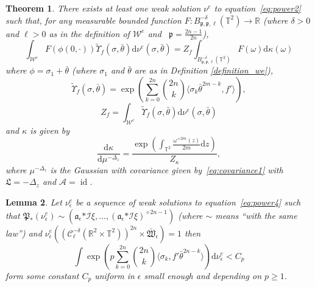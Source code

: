 \documentclass[a4paper,10pt]{article}
\newcommand{\asterisk}{\mathord{*}}
\newcommand{\mathd}{\mathrm{d}}
\newcommand{\tmop}[1]{\ensuremath{\operatorname{#1}}}
\newtheorem{theorem}{Theorem}
\newtheorem{lemma}[theorem]{Lemma}
\begin{document}
\begin{theorem}
  \label{theorem_polynomialreduction}There exists at least one weak solution
  $\nu^e$ to equation~{\eqref{eq:power2}} such that, for any measurable
  bounded function $F : B^{- \delta}_{\mathfrak{p}, \mathfrak{p}, \ell}
  (\mathbb{T}^2) \rightarrow \mathbb{R}$ (where $\delta > 0$ and $\ell > 0$ as
  in the definition of $\mathcal{W}^e$ and \ $\mathfrak{p} = \frac{2 n - 1}{2
  n}$),
  \begin{equation}
    \int_{\mathcal{W}^e} F (\phi (0, \cdot)) \tilde{\Upsilon}_f (\sigma,
    \bar{\theta}) \mathd \nu^e (\sigma, \bar{\theta}) = Z_f \int_{B^{-
    \delta}_{\mathfrak{p}, \mathfrak{p}, \ell} (\mathbb{T}^2)} F (\omega)
    \mathd \kappa (\omega) \label{eq:powermain}
  \end{equation}
  where $\phi = \sigma_1 + \bar{\theta}$ (where $\sigma_1$ and $\bar{\theta}$
  are as in Definition \ref{definition_we}),
  \[ \tilde{\Upsilon}_f (\sigma, \bar{\theta}) = \exp \left( \sum_{k = 0}^{2
     n} \binom{2 n}{k} \langle \sigma_k \bar{\theta}^{2 m - k}, f' \rangle
     \right), \]
  \[ Z_f = \int_{\mathcal{W}^e} \tilde{\Upsilon}_f (\sigma, \bar{\theta})
     \mathd \nu^e (\sigma, \bar{\theta}) \]
  and $\kappa$ is given by
  \[ \frac{\mathd \kappa}{\mathd \mu^{- \Delta_z}} = \frac{\exp \left(
     \int_{\mathbb{T}^2} \frac{\omega^{\diamond 2 m} (z)}{2 m} \mathd z
     \right)}{Z_{\kappa}}, \]
  where $\mu^{- \Delta_z}$ is the Gaussian with covariance given
  by~{\eqref{eq:covariance1}} with $\mathfrak{L} = - \Delta_z$ and
  $\mathcal{A} = \tmop{id}$.
\end{theorem}

\begin{lemma}
  \label{lemma_uniform}Let $\nu^e_{\epsilon}$ be a sequence of weak solutions
  to equation~{\eqref{eq:power4}} such that $\mathfrak{P}_{\asterisk}
  (\nu_{\epsilon}^e) \sim (\mathcal{\mathfrak{a}}_{\epsilon} \asterisk
  \mathcal{I} \xi, \ldots, (\mathcal{\mathfrak{a}}_{\epsilon} \asterisk
  \mathcal{I} \xi)^{\diamond 2 n - 1})$ (where $\sim$ means ``with the same
  law'') and $\nu^e_{\epsilon} ((\mathcal{C}^{- \delta}_{\ell} (\mathbb{R}^2
  \times \mathbb{T}^2))^{2 n} \times \mathfrak{\bar{W}}_{\epsilon}) = 1$ then
  \[ \int \exp \left( p \sum_{k = 0}^{2 n} \binom{2 n}{k} \langle \sigma_k,
     f'  \bar{\theta}^{2 n - k} \rangle \right) \mathd \nu_{\epsilon}^e < C_p
  \]
  form some constant $C_p$ uniform in $\epsilon$ small enough and depending on
  $p \geq 1$.
\end{lemma}
\end{document}

